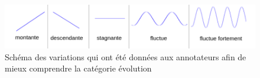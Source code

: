 \begin{figure}[h]
  \centering
  \includegraphics[width=14cm]{./Chapitre4/figures/variation.png}
  \caption{Schéma des variations qui ont été données aux annotateurs afin de mieux comprendre la catégorie évolution}
  \label{fig:variation}
\end{figure}
